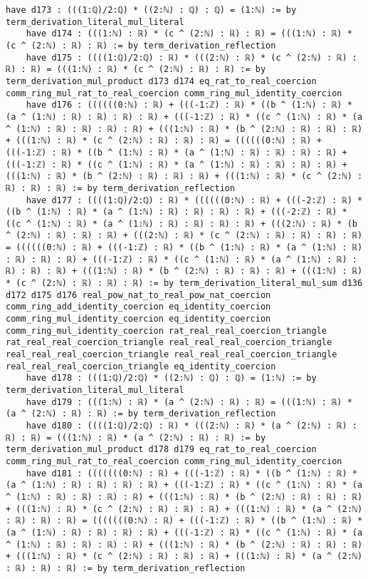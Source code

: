 \documentclass{article}
\begin{document}
\begin{tcolorbox}[colback=white!10, width=\linewidth]
\begin{lstlisting}[language=Lean4]
    have d173 : (((1:ℚ)/2:ℚ) * ((2:ℕ) : ℚ) : ℚ) = (1:ℕ) := by term_derivation_literal_mul_literal
    have d174 : (((1:ℕ) : ℝ) * (c ^ (2:ℕ) : ℝ) : ℝ) = (((1:ℕ) : ℝ) * (c ^ (2:ℕ) : ℝ) : ℝ) := by term_derivation_reflection
    have d175 : ((((1:ℚ)/2:ℚ) : ℝ) * (((2:ℕ) : ℝ) * (c ^ (2:ℕ) : ℝ) : ℝ) : ℝ) = (((1:ℕ) : ℝ) * (c ^ (2:ℕ) : ℝ) : ℝ) := by term_derivation_mul_product d173 d174 eq_rat_to_real_coercion comm_ring_mul_rat_to_real_coercion comm_ring_mul_identity_coercion
    have d176 : ((((((0:ℕ) : ℝ) + (((-1:ℤ) : ℝ) * ((b ^ (1:ℕ) : ℝ) * (a ^ (1:ℕ) : ℝ) : ℝ) : ℝ) : ℝ) + (((-1:ℤ) : ℝ) * ((c ^ (1:ℕ) : ℝ) * (a ^ (1:ℕ) : ℝ) : ℝ) : ℝ) : ℝ) + (((1:ℕ) : ℝ) * (b ^ (2:ℕ) : ℝ) : ℝ) : ℝ) + (((1:ℕ) : ℝ) * (c ^ (2:ℕ) : ℝ) : ℝ) : ℝ) = ((((((0:ℕ) : ℝ) + (((-1:ℤ) : ℝ) * ((b ^ (1:ℕ) : ℝ) * (a ^ (1:ℕ) : ℝ) : ℝ) : ℝ) : ℝ) + (((-1:ℤ) : ℝ) * ((c ^ (1:ℕ) : ℝ) * (a ^ (1:ℕ) : ℝ) : ℝ) : ℝ) : ℝ) + (((1:ℕ) : ℝ) * (b ^ (2:ℕ) : ℝ) : ℝ) : ℝ) + (((1:ℕ) : ℝ) * (c ^ (2:ℕ) : ℝ) : ℝ) : ℝ) := by term_derivation_reflection
    have d177 : ((((1:ℚ)/2:ℚ) : ℝ) * ((((((0:ℕ) : ℝ) + (((-2:ℤ) : ℝ) * ((b ^ (1:ℕ) : ℝ) * (a ^ (1:ℕ) : ℝ) : ℝ) : ℝ) : ℝ) + (((-2:ℤ) : ℝ) * ((c ^ (1:ℕ) : ℝ) * (a ^ (1:ℕ) : ℝ) : ℝ) : ℝ) : ℝ) + (((2:ℕ) : ℝ) * (b ^ (2:ℕ) : ℝ) : ℝ) : ℝ) + (((2:ℕ) : ℝ) * (c ^ (2:ℕ) : ℝ) : ℝ) : ℝ) : ℝ) = ((((((0:ℕ) : ℝ) + (((-1:ℤ) : ℝ) * ((b ^ (1:ℕ) : ℝ) * (a ^ (1:ℕ) : ℝ) : ℝ) : ℝ) : ℝ) + (((-1:ℤ) : ℝ) * ((c ^ (1:ℕ) : ℝ) * (a ^ (1:ℕ) : ℝ) : ℝ) : ℝ) : ℝ) + (((1:ℕ) : ℝ) * (b ^ (2:ℕ) : ℝ) : ℝ) : ℝ) + (((1:ℕ) : ℝ) * (c ^ (2:ℕ) : ℝ) : ℝ) : ℝ) := by term_derivation_literal_mul_sum d136 d172 d175 d176 real_pow_nat_to_real_pow_nat_coercion comm_ring_add_identity_coercion eq_identity_coercion comm_ring_mul_identity_coercion eq_identity_coercion comm_ring_mul_identity_coercion rat_real_real_coercion_triangle rat_real_real_coercion_triangle real_real_real_coercion_triangle real_real_real_coercion_triangle real_real_real_coercion_triangle real_real_real_coercion_triangle eq_identity_coercion
    have d178 : (((1:ℚ)/2:ℚ) * ((2:ℕ) : ℚ) : ℚ) = (1:ℕ) := by term_derivation_literal_mul_literal
    have d179 : (((1:ℕ) : ℝ) * (a ^ (2:ℕ) : ℝ) : ℝ) = (((1:ℕ) : ℝ) * (a ^ (2:ℕ) : ℝ) : ℝ) := by term_derivation_reflection
    have d180 : ((((1:ℚ)/2:ℚ) : ℝ) * (((2:ℕ) : ℝ) * (a ^ (2:ℕ) : ℝ) : ℝ) : ℝ) = (((1:ℕ) : ℝ) * (a ^ (2:ℕ) : ℝ) : ℝ) := by term_derivation_mul_product d178 d179 eq_rat_to_real_coercion comm_ring_mul_rat_to_real_coercion comm_ring_mul_identity_coercion
    have d181 : (((((((0:ℕ) : ℝ) + (((-1:ℤ) : ℝ) * ((b ^ (1:ℕ) : ℝ) * (a ^ (1:ℕ) : ℝ) : ℝ) : ℝ) : ℝ) + (((-1:ℤ) : ℝ) * ((c ^ (1:ℕ) : ℝ) * (a ^ (1:ℕ) : ℝ) : ℝ) : ℝ) : ℝ) + (((1:ℕ) : ℝ) * (b ^ (2:ℕ) : ℝ) : ℝ) : ℝ) + (((1:ℕ) : ℝ) * (c ^ (2:ℕ) : ℝ) : ℝ) : ℝ) + (((1:ℕ) : ℝ) * (a ^ (2:ℕ) : ℝ) : ℝ) : ℝ) = (((((((0:ℕ) : ℝ) + (((-1:ℤ) : ℝ) * ((b ^ (1:ℕ) : ℝ) * (a ^ (1:ℕ) : ℝ) : ℝ) : ℝ) : ℝ) + (((-1:ℤ) : ℝ) * ((c ^ (1:ℕ) : ℝ) * (a ^ (1:ℕ) : ℝ) : ℝ) : ℝ) : ℝ) + (((1:ℕ) : ℝ) * (b ^ (2:ℕ) : ℝ) : ℝ) : ℝ) + (((1:ℕ) : ℝ) * (c ^ (2:ℕ) : ℝ) : ℝ) : ℝ) + (((1:ℕ) : ℝ) * (a ^ (2:ℕ) : ℝ) : ℝ) : ℝ) := by term_derivation_reflection

\end{lstlisting}
\end{tcolorbox}
\end{document}
